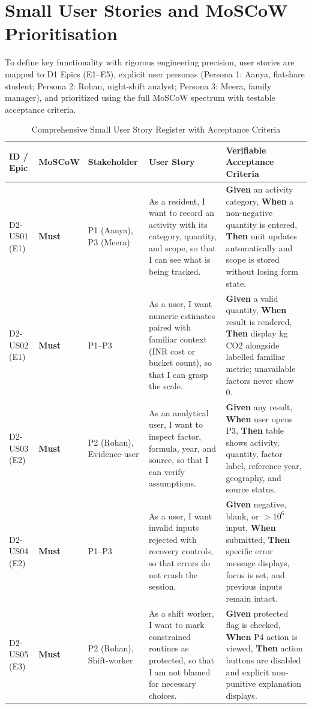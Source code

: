\documentclass[12pt,a4paper]{article}
\begin{document}
\section{Small User Stories and MoSCoW Prioritisation}

To define key functionality with rigorous engineering precision, user stories are mapped to D1 Epics (E1--E5), explicit user personas (Persona 1: Aanya, flatshare student; Persona 2: Rohan, night-shift analyst; Persona 3: Meera, family manager), and prioritized using the full MoSCoW spectrum with testable acceptance criteria.

\begin{table}[ht]
\centering
\scriptsize
\caption{Comprehensive Small User Story Register with Acceptance Criteria}
\begin{tabularx}{\textwidth}{@{}p{1.2cm}p{1.3cm}p{1.5cm}Xp{4.8cm}@{}}
\toprule
\textbf{ID / Epic} & \textbf{MoSCoW} & \textbf{Stakeholder} & \textbf{User Story} & \textbf{Verifiable Acceptance Criteria}\\
\midrule
D2-US01 (E1) & \textbf{Must} & P1 (Aanya), P3 (Meera) & As a resident, I want to record an activity with its category, quantity, and scope, so that I can see what is being tracked. & \textbf{Given} an activity category, \textbf{When} a non-negative quantity is entered, \textbf{Then} unit updates automatically and scope is stored without losing form state.\\
D2-US02 (E1) & \textbf{Must} & P1--P3 & As a user, I want numeric estimates paired with familiar context (INR cost or bucket count), so that I can grasp the scale. & \textbf{Given} a valid quantity, \textbf{When} result is rendered, \textbf{Then} display kg CO2 alongside labelled familiar metric; unavailable factors never show 0.\\
D2-US03 (E2) & \textbf{Must} & P2 (Rohan), Evidence-user & As an analytical user, I want to inspect factor, formula, year, and source, so that I can verify assumptions. & \textbf{Given} any result, \textbf{When} user opens P3, \textbf{Then} table shows activity, quantity, factor label, reference year, geography, and source status.\\
D2-US04 (E2) & \textbf{Must} & P1--P3 & As a user, I want invalid inputs rejected with recovery controls, so that errors do not crash the session. & \textbf{Given} negative, blank, or $>10^6$ input, \textbf{When} submitted, \textbf{Then} specific error message displays, focus is set, and previous inputs remain intact.\\
D2-US05 (E3) & \textbf{Must} & P2 (Rohan), Shift-worker & As a shift worker, I want to mark constrained routines as protected, so that I am not blamed for necessary choices. & \textbf{Given} protected flag is checked, \textbf{When} P4 action is viewed, \textbf{Then} action buttons are disabled and explicit non-punitive explanation displays.\\

\end{tabularx}
\end{table}
\end{document}
